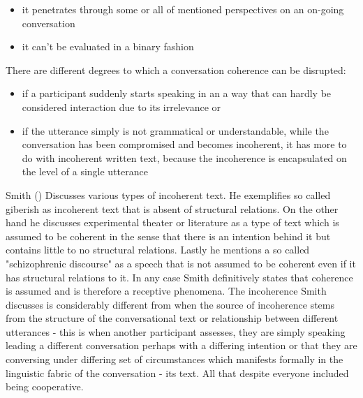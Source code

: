 \documentclass[12pt]{report}
\begin{document}
{\begin{itemize}
\item
it penetrates through some or all of mentioned perspectives on an on-going conversation
\item
it can't be evaluated in a binary fashion
\end{itemize}

There are different degrees to which a conversation coherence can be disrupted:
\begin{itemize}

\item
   if a participant suddenly starts speaking
    in an a way that can hardly be considered interaction
    due to its irrelevance or

\item
   if the utterance simply is not grammatical or understandable,
    while the conversation has been compromised and becomes incoherent,
    it has more to do with incoherent written text, because
    the incoherence is encapsulated on the level of a single utterance
\end{itemize}

Smith () Discusses various types of incoherent text.
He exemplifies so called giberish as incoherent text that is absent of structural relations.
On the other hand he discusses experimental theater or literature as a type of text
which is assumed to be coherent in the sense that there is an intention behind it
but contains little to no structural relations.
Lastly he mentions a so called "schizophrenic discourse" as a speech that
is not assumed to be coherent even if it has structural relations to it.
In any case Smith definitively states that coherence is assumed
and is therefore a receptive phenomena.
The incoherence Smith discusses is considerably different from when
the source of incoherence stems from
    the structure of the conversational text or
    relationship between different utterances
    - this is when another participant assesses,
        they are simply speaking leading a different conversation
        perhaps with a differing intention
        or that they are conversing under differing set of circumstances
        which manifests formally in the linguistic fabric of the conversation - its text.
        All that despite everyone included being cooperative.

}
\end{document}
